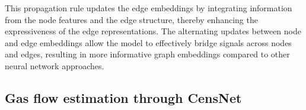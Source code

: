 This propagation rule updates the edge embeddings by integrating information from the node features and the edge structure, thereby enhancing the expressiveness of the edge representations. The alternating updates between node and edge embeddings allow the model to effectively bridge signals across nodes and edges, resulting in more informative graph embeddings compared to other neural network approaches.


%
%
%
%
%
%

\subsection{Gas flow estimation through CensNet} \label{sec:LinealCensnet_formulation}

